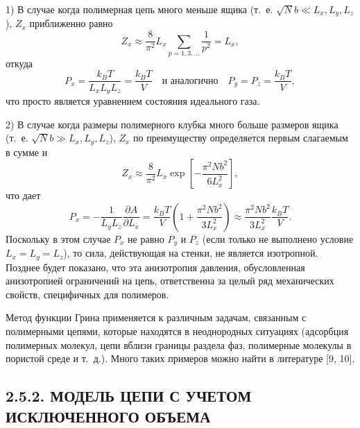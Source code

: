 \documentclass[12pt,a4paper]{article}
\begin{document}
1) В случае когда полимерная цепь много меньше ящика (т.~е. $\sqrt{N}b \ll L_x, L_y, L_z$), $Z_x$ приближенно равно
\begin{equation}
Z_x \approx \frac{8}{\pi^2}L_x\sum_{p=1,3,\dots}\frac{1}{p^2} = L_x, \tag{2.63}
\end{equation}
откуда
\begin{equation}
P_x = \frac{k_B T}{L_x L_y L_z} = \frac{k_B T}{V} \quad \text{и аналогично} \quad P_y = P_z = \frac{k_B T}{V}, \tag{2.64}
\end{equation}
что просто является уравнением состояния идеального газа.

2) В случае когда размеры полимерного клубка много больше размеров ящика (т.~е. $\sqrt{N}b \gg L_x, L_y, L_z$), $Z_x$ по преимуществу определяется первым слагаемым в сумме и
\begin{equation}
Z_x \approx \frac{8}{\pi^2}L_x\exp\left[-\frac{\pi^2 Nb^2}{6L_x^2}\right], \tag{2.65}
\end{equation}
что дает
\begin{equation}
P_x = -\frac{1}{L_y L_z}\frac{\partial A}{\partial L_x} = \frac{k_B T}{V}\left(1 + \frac{\pi^2 Nb^2}{3L_x^2}\right) \approx \frac{\pi^2 Nb^2}{3L_x^2}\frac{k_B T}{V}. \tag{2.66}
\end{equation}
Поскольку в этом случае $P_x$ не равно $P_y$ и $P_z$ (если только не выполнено условие $L_x = L_y = L_z$), то сила, действующая на стенки, не является изотропной. Позднее будет показано, что эта анизотропия давления, обусловленная анизотропией ограничений на цепь, ответственна за целый ряд механических свойств, специфичных для полимеров.

Метод функции Грина применяется к различным задачам, связанным с полимерными цепями, которые находятся в неоднородных ситуациях (адсорбция полимерных молекул, цепи вблизи границы раздела фаз, полимерные молекулы в пористой среде и т.~д.). Много таких примеров можно найти в литературе [9, 10].

\subsection*{2.5.2. МОДЕЛЬ ЦЕПИ С УЧЕТОМ ИСКЛЮЧЕННОГО ОБЪЕМА}
\end{document}
